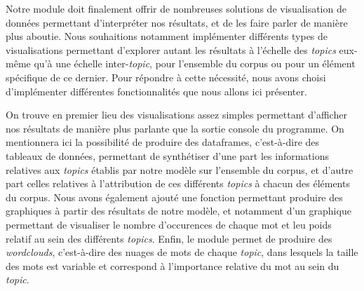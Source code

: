\documentclass[letterpaper,portrait,12pt]{article}
\begin{document}
\textbf{{\Large 	}}Notre module doit finalement offrir de nombreuses solutions de visualisation de donn\'{e}es permettant d'interpr\'{e}ter nos r\'{e}sultats, et de les faire parler de mani\`{e}re plus aboutie. Nous souhaitions notamment impl\'{e}menter diff\'{e}rents types de visualisations permettant d'explorer autant les r\'{e}sultats \`{a} l'\'{e}chelle des \emph{topics} eux-m\^{e}me qu'\`{a} une \'{e}chelle inter-\emph{topic}, pour l'ensemble du corpus ou pour un \'{e}l\'{e}ment sp\'{e}cifique de ce dernier. Pour r\'{e}pondre \`{a} cette n\'{e}cessit\'{e}, nous avons choisi d'impl\'{e}menter diff\'{e}rentes fonctionnalit\'{e}s que nous allons ici pr\'{e}senter.





	On trouve en premier lieu des visualisations assez simples permettant d'afficher nos r\'{e}sultats de mani\`{e}re plus parlante que la sortie console du programme. On mentionnera ici la possibilit\'{e} de produire des dataframes, c'est-\`{a}-dire des tableaux de donn\'{e}es, permettant de synth\'{e}tiser d'une part les informations relatives aux \emph{topics} \'{e}tablis par notre mod\`{e}le sur l'ensemble du corpus, et d'autre part celles relatives \`{a} l'attribution de ces diff\'{e}rents \emph{topics} \`{a} chacun des \'{e}l\'{e}ments du corpus. Nous avons \'{e}galement ajout\'{e} une fonction permettant produire des graphiques \`{a} partir des r\'{e}sultats de notre mod\`{e}le, et notamment d'un graphique permettant de visualiser le nombre d'occurences de chaque mot et leu poids relatif au sein des diff\'{e}rents \emph{topics}. Enfin, le module permet de produire des \emph{wordclouds}, c'est-\`{a}-dire des nuages de mots de chaque \emph{topic}, dans lesquels la taille des mots est variable et correspond \`{a} l'importance relative du mot au sein du \emph{topic}.
\end{document}
